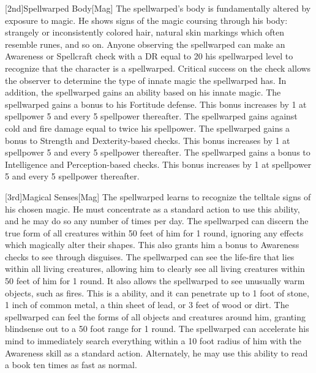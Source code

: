         [2nd]{Spellwarped Body}[Mag]
        The spellwarped's body is fundamentally altered by exposure to magic.
        He shows signs of the magic coursing through his body: strangely or inconsistently colored hair, natural skin markings which often resemble runes, and so on.
        Anyone observing the spellwarped can make an Awareness or Spellcraft check with a DR equal to 20 \sub his spellwarped level to recognize that the character is a spellwarped.
        Critical success on the check allows the observer to determine the type of innate magic the spellwarped has.
        In addition, the spellwarped gains an ability based on his innate magic.
        The spellwarped gains a  bonus to his Fortitude defense.
        This bonus increases by 1 at spellpower 5 and every 5 spellpower thereafter.
        The spellwarped gains  against cold and fire damage equal to twice his spellpower.
        The spellwarped gains a  bonus to Strength and Dexterity-based checks.
        This bonus increases by 1 at spellpower 5 and every 5 spellpower thereafter.
        The spellwarped gains a  bonus to Intelligence and Perception-based checks.
        This bonus increases by 1 at spellpower 5 and every 5 spellpower thereafter.

        [3rd]{Magical Senses}[Mag]
        The spellwarped learns to recognize the telltale signs of his chosen magic.
        He must concentrate as a standard action to use this ability, and he may do so any number of times per day.
        The spellwarped can discern the true form of all creatures within 50 feet of him for 1 round, ignoring any effects which magically alter their shapes.
        This also grants him a  bonus to Awareness checks to see through disguises.
        The spellwarped can see the life-fire that lies within all living creatures, allowing him to clearly see all living creatures within 50 feet of him for 1 round.
        It also allows the spellwarped to see unusually warm objects, such as fires.
        This is a  ability, and it can penetrate up to 1 foot of stone, 1 inch of common metal, a thin sheet of lead, or 3 feet of wood or dirt.
        The spellwarped can feel the forms of all objects and creatures around him, granting blindsense out to a 50 foot range for 1 round.
        The spellwarped can accelerate his mind to immediately search everything within a 10 foot radius of him with the Awareness skill as a standard action.
        Alternately, he may use this ability to read a book ten times as fast as normal.

